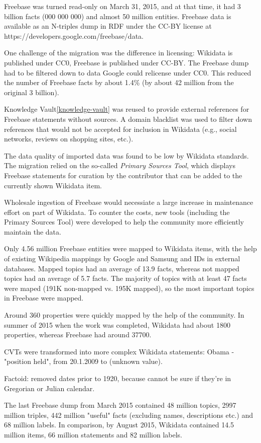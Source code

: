 Freebase was turned read-only on March 31, 2015, and at that time, it had 3
billion facts (000 000 000) and almost 50 million entities. Freebase data is
available as an N-triples dump in RDF under the CC-BY license at
https://developers.google.com/freebase/data.

One challenge of the migration was the difference in licensing: Wikidata is
published under CC0, Freebase is published under CC-BY. The Freebase dump had to
be filtered down to data Google could relicense under CC0. This reduced the
number of Freebase facts by about 1.4\% (by about 42 million from the original
3 billion).

Knowledge Vault\ref{knowledge-vault} was reused to provide external references
for Freebase statements without sources. A domain blacklist was used to filter
down references that would not be accepted for inclusion in Wikidata (e.g.,
social networks, reviews on shopping sites, etc.).

The data quality of imported data was found to be low by Wikidata standards.
The migration relied on the so-called \textit{Primary Sources Tool}, which
displays Freebase statements for curation by the contributor that can be added
to the currently shown Wikidata item.

Wholesale ingestion of Freebase would necessiate a large increase in
maintenance effort on part of Wikidata. To counter the costs, new tools
(including the Primary Sources Tool) were developed to help the community
more efficiently maintain the data.

Only 4.56 million Freebase entities were mapped to Wikidata items, with the help
of existing Wikipedia mappings by Google and Samsung and IDs in external
databases.
Mapped topics had an average of 13.9 facts, whereas not mapped topics had an
average of 5.7 facts. The majority of topics with at least 47 facts were maped
(191K non-mapped vs. 195K mapped), so the most important topics in Freebase were
mapped.

Around 360 properties were quickly mapped by the help of the community. In
summer of 2015 when the work was completed, Wikidata had about 1800 properties,
whereas Freebase had around 37700.

CVTs were transformed into more complex Wikidata statements:
Obama - "position held", from 20.1.2009 to (unknown value).

Factoid: removed dates prior to 1920, because cannot be sure if they're in
Gregorian or Julian calendar.

The last Freebase dump from March 2015 contained 48 million topics, 2997 million
triples, 442 million "useful" facts (excluding names, descriptions etc.) and 68
million labels.
In comparison, by August 2015, Wikidata contained 14.5 million items, 66 million
statements and 82 million labels.


